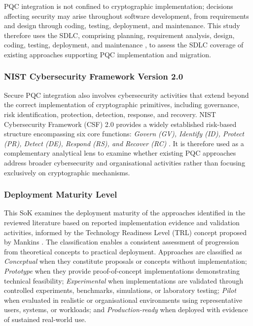 \documentclass[letterpaper,twocolumn,10pt]{article}
\begin{document}
PQC integration is not confined to cryptographic implementation; decisions affecting security may arise throughout software development, from requirements and design through coding, testing, deployment, and maintenance. This study therefore uses the SDLC, comprising planning, requirement analysis, design, coding, testing, deployment, and maintenance \cite{ibm_sdlc_2024}, to assess the SDLC coverage of existing approaches supporting PQC implementation and migration. 

\subsubsection{NIST Cybersecurity Framework Version 2.0}
\label{NISTCSFV2}

Secure PQC integration also involves cybersecurity activities that extend beyond the correct implementation of cryptographic primitives, including governance, risk identification, protection, detection, response, and recovery. NIST Cybersecurity Framework (CSF) 2.0 provides a widely established risk-based structure encompassing six core functions: \textit{Govern (GV), Identify (ID), Protect (PR), Detect (DE), Respond (RS), and Recover (RC)} \cite{nist_cswp_29_2024}. It is therefore used as a complementary analytical lens to examine whether existing PQC approaches address broader cybersecurity and organisational activities rather than focusing exclusively on cryptographic mechanisms.

\subsubsection{Deployment Maturity Level}
\label{DeplMat}

This SoK examines the deployment maturity of the approaches identified in the reviewed literature based on reported implementation evidence and validation activities, informed by the Technology Readiness Level (TRL) concept proposed by Mankins \cite{mankins1995technology}. The classification enables a consistent assessment of progression from theoretical concepts to practical deployment. Approaches are classified as \textit{Conceptual} when they constitute proposals or concepts without implementation; \textit{Prototype} when they provide proof-of-concept implementations demonstrating technical feasibility; \textit{Experimental} when implementations are validated through controlled experiments, benchmarks, simulations, or laboratory testing; \textit{Pilot} when evaluated in realistic or organisational environments using representative users, systems, or workloads; and \textit{Production-ready} when deployed with evidence of sustained real-world use.
\end{document}
